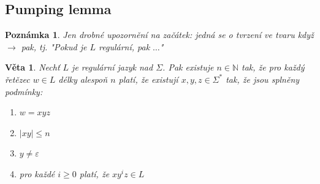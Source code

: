 \documentclass[10pt, a4paper, titlepage]{article}
\theoremstyle{note}
\newtheorem{veta}{Věta}
\newtheorem{poznamka}{Poznámka}
\begin{document}
\subsection{Pumping lemma}

\begin{poznamka}
Jen drobné upozornění na začátek: jedná se o tvrzení ve tvaru když $\rightarrow$ pak, tj. "Pokud je $L$ regulární, pak $\ldots$"
\end{poznamka}

\begin{veta}
Nechť $L$ je regulární jazyk nad $\Sigma$. Pak existuje $n \in \mathbb{N}$ tak, že pro každý řetězec $w \in L$ délky alespoň $n$ platí, že existují $x,y,z \in \Sigma^*$ tak, že jsou splněny podmínky:
\begin{enumerate}
\item
$w = xyz$
\item
$|xy| \le n$
\item
$y \neq \varepsilon$
\item
pro každé $i \ge 0$ platí, že $xy^iz \in L$
\end{enumerate}
\end{veta}
\end{document}
